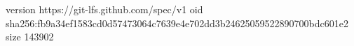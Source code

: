 version https://git-lfs.github.com/spec/v1
oid sha256:fb9a34ef1583cd0d57473064c7639e4e702dd3b24625059522890700bdc601e2
size 143902
